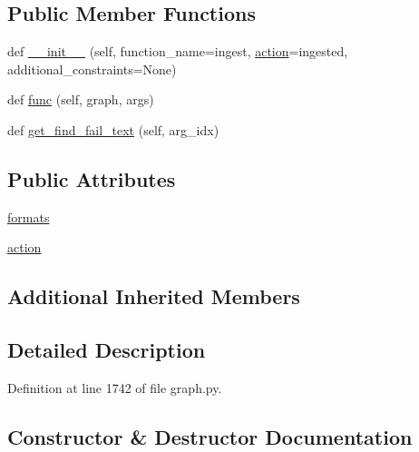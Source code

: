 \subsection*{Public Member Functions}
\begin{DoxyCompactItemize}
\item 
def \hyperlink{classlight__chats_1_1graph_1_1IngestFunction_ad4e544e64b77af820462e71260a067d5}{\+\_\+\+\_\+init\+\_\+\+\_\+} (self, function\+\_\+name=\textquotesingle{}ingest\textquotesingle{}, \hyperlink{classlight__chats_1_1graph_1_1IngestFunction_a622f30ce7ef9f3c210c1881eab7c2744}{action}=\textquotesingle{}ingested\textquotesingle{}, additional\+\_\+constraints=None)
\item 
def \hyperlink{classlight__chats_1_1graph_1_1IngestFunction_acf3afc20e4e55a9bd2783d2bad592a88}{func} (self, graph, args)
\item 
def \hyperlink{classlight__chats_1_1graph_1_1IngestFunction_aae6cb9fc171d5a59c3d2bafae9ed58b7}{get\+\_\+find\+\_\+fail\+\_\+text} (self, arg\+\_\+idx)
\end{DoxyCompactItemize}
\subsection*{Public Attributes}
\begin{DoxyCompactItemize}
\item 
\hyperlink{classlight__chats_1_1graph_1_1IngestFunction_af639522820335d377bf31825afe21584}{formats}
\item 
\hyperlink{classlight__chats_1_1graph_1_1IngestFunction_a622f30ce7ef9f3c210c1881eab7c2744}{action}
\end{DoxyCompactItemize}
\subsection*{Additional Inherited Members}


\subsection{Detailed Description}
\begin{DoxyVerb}
\end{DoxyVerb}
 

Definition at line 1742 of file graph.\+py.



\subsection{Constructor \& Destructor Documentation}
\mbox{\label{classlight__chats_1_1graph_1_1IngestFunction_ad4e544e64b77af820462e71260a067d5}} 
